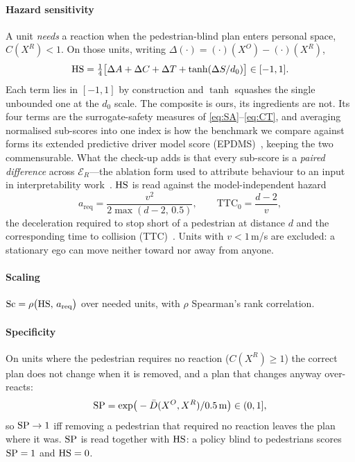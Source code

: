 \paragraph{Hazard sensitivity}
A unit \emph{needs} a reaction when the pedestrian-blind plan enters personal space, $C(X^{R})<1$. On
those units, writing $\Delta(\cdot)=(\cdot)(X^{O})-(\cdot)(X^{R})$,
\begin{equation}
\mathrm{HS}=\tfrac14\big[\Delta A+\Delta C+\Delta T+\tanh(\Delta S/d_0)\big]\in[-1,1].
\label{eq:hs}
\end{equation}
Each term lies in $[-1,1]$ by construction and $\tanh$ squashes the single unbounded one at the $d_0$
scale. The composite is ours, its ingredients are not. Its four terms are the surrogate-safety
measures of \eqref{eq:SA}--\eqref{eq:CT}, and averaging normalised sub-scores into one index is how
the benchmark we compare against forms its extended predictive driver model score (EPDMS)~\cite{dauner2024navsim}, keeping the two commensurable.
What the check-up adds is that every sub-score is a \emph{paired difference} across
$\mathcal{E}_R$---the ablation form used to attribute behaviour to an input in interpretability
work~\cite{zou2023repe}. $\mathrm{HS}$ is read against the model-independent hazard
\begin{equation}
a_{\mathrm{req}}=\frac{v^{2}}{2\max(d-2,\,0.5)},\qquad \mathrm{TTC}_0=\frac{d-2}{v},
\label{eq:hazard}
\end{equation}
the deceleration required to stop short of a pedestrian at distance $d$ and the corresponding
time to collision (TTC)~\cite{gettman2003surrogate}. Units with $v<1$\,m/s are excluded: a
stationary ego can move neither toward nor away from anyone.

\paragraph{Scaling}
$\mathrm{Sc}=\rho\big(\mathrm{HS},\,a_{\mathrm{req}}\big)$ over needed units, with $\rho$ Spearman's rank
correlation.
\paragraph{Specificity}
On units where the pedestrian requires no reaction ($C(X^{R})\ge1$) the correct plan does not change when it is removed, and a plan that changes anyway over-reacts:
\begin{equation}
\mathrm{SP}=\exp\!\big(-\bar D(X^{O},X^{R})/0.5\,\mathrm{m}\big)\in(0,1],
\label{eq:sp}
\end{equation}
so $\mathrm{SP}\to1$ iff removing a pedestrian that required no reaction leaves the plan where it was. $\mathrm{SP}$ is read together with $\mathrm{HS}$: a policy blind to pedestrians scores $\mathrm{SP}=1$ and $\mathrm{HS}=0$.

